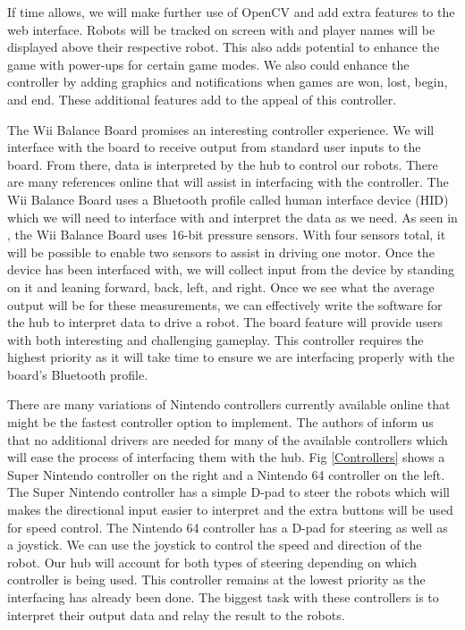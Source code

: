 \documentclass[11pt]{ieeeconf}
\begin{document}
If time allows, we will make further use of OpenCV and add extra features to the web interface. Robots will be tracked on screen with and player names will be displayed above their respective robot. This also adds potential to enhance the game with power-ups for certain game modes. We also could enhance the controller by adding graphics and notifications when games are won, lost, begin, and end. These additional features add to the appeal of this controller.

The Wii Balance Board promises an interesting controller experience. We will interface with the board to receive output from standard user inputs to the board. From there, data is interpreted by the hub to control our robots. There are many references online that will assist in interfacing with the controller. The Wii Balance Board uses a Bluetooth profile called human interface device (HID) which we will need to interface with and interpret the data as we need. As seen in \cite{homebrew}, the Wii Balance Board uses 16-bit pressure sensors. With four sensors total, it will be possible to enable two sensors to assist in driving one motor. Once the device has been interfaced with, we will collect input from the device by standing on it and leaning forward, back, left, and right. Once we see what the average output will be for these measurements, we can effectively write the software for the hub to interpret data to drive a robot. The board feature will provide users with both interesting and challenging gameplay. This controller requires the highest priority as it will take time to ensure we are interfacing properly with the board's Bluetooth profile. 

There are many variations of Nintendo controllers currently available online that might be the fastest controller option to implement. The authors of \cite{controller:19} inform us that no additional drivers are needed for many of the available controllers which will ease the process of interfacing them with the hub. Fig \ref{Controllers} shows a Super Nintendo controller on the right and a Nintendo 64 controller on the left. The Super Nintendo controller has a simple D-pad to steer the robots which will makes the directional input easier to interpret and the extra buttons will be used for speed control. The Nintendo 64 controller has a D-pad for steering as well as a joystick. We can use the joystick to control the speed and direction of the robot. Our hub will account for both types of steering depending on which controller is being used. This controller remains at the lowest priority as the interfacing has already been done. The biggest task with these controllers is to interpret their output data and relay the result to the robots.
\end{document}
